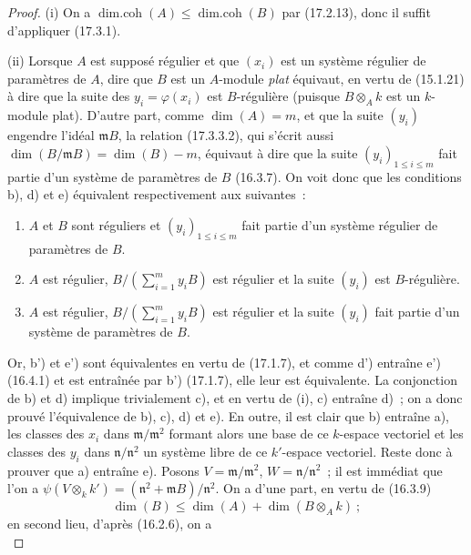 \begin{proof}
\textnormal{(i)} On a
$\operatorname{dim.coh}(A)\leq\operatorname{dim.coh}(B)$ par (17.2.13), donc
il suffit d'appliquer (17.3.1).

\textnormal{(ii)} Lorsque $A$ est supposé régulier et que $(x_i)$ est un
système régulier de paramètres de $A$, dire que $B$ est un $A$-module
\emph{plat} équivaut, en vertu de (15.1.21) à dire que la suite des
$y_i=\varphi(x_i)$ est $B$-régulière (puisque $B\otimes_A k$ est un
$k$-module plat). D'autre part, comme $\dim(A)=m$, et que la suite $(y_i)$
engendre l'idéal $\mathfrak{m}B$, la relation (17.3.3.2), qui s'écrit aussi
$\dim(B/\mathfrak{m}B)=\dim(B)-m$, équivaut à dire que la suite
$(y_i)_{1\leq i\leq m}$ fait partie d'un système de paramètres de $B$
(16.3.7). On voit donc que les conditions b), d) et e) équivalent
respectivement aux suivantes~:
\begin{enumerate}
  \item[\rm b')] $A$ et $B$ sont réguliers et $(y_i)_{1\leq i\leq m}$ fait
  partie d'un système régulier de paramètres de $B$.
  \item[\rm d')] $A$ est régulier,
  $B/(\sum_{i=1}^m y_iB)$ est régulier et la suite $(y_i)$ est
  $B$-régulière.
  \item[\rm e')] $A$ est régulier,
  $B/(\sum_{i=1}^m y_iB)$ est régulier et la suite $(y_i)$ fait partie d'un
  système de paramètres de $B$.
\end{enumerate}
Or, b') et e') sont équivalentes en vertu de (17.1.7), et comme d') entraîne
e') (16.4.1) et est entraînée par b') (17.1.7), elle leur est équivalente. La
conjonction
de b) et d) implique trivialement c), et en vertu de (i), c) entraîne d)~; on
a donc prouvé l'équivalence de b), c), d) et e). En outre, il est clair que b)
entraîne a), les classes des $x_i$ dans
$\mathfrak{m}/\mathfrak{m}^2$ formant alors une base de ce $k$-espace
vectoriel et les classes des $y_i$ dans $\mathfrak{n}/\mathfrak{n}^2$ un
système libre de ce $k'$-espace vectoriel. Reste donc à prouver que a)
entraîne e). Posons $V=\mathfrak{m}/\mathfrak{m}^2$,
$W=\mathfrak{n}/\mathfrak{n}^2$~; il est immédiat que l'on a
$\psi(V\otimes_k k')=(\mathfrak{n}^2+\mathfrak{m}B)/\mathfrak{n}^2$. On a
d'une part, en vertu de (16.3.9)
\begin{equation}
\label{0.17.3.3.3-fr}
\tag{17.3.3.3}
  \dim(B)\leq\dim(A)+\dim(B\otimes_A k)~;
\end{equation}
en second lieu, d'après (16.2.6), on a
\begin{equation}

\end{equation}
\end{proof}
